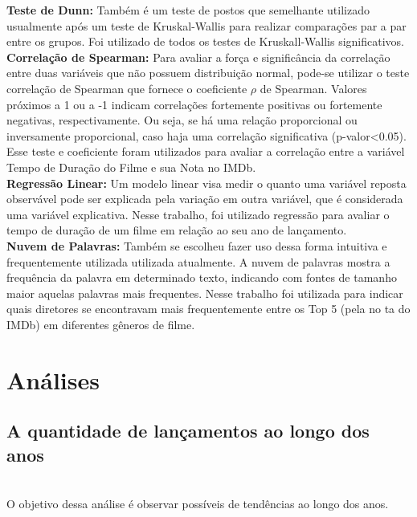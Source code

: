 \documentclass[a4paper, 12pt]{article} %
\begin{document}
\textbf{Teste de Dunn:} Também é um teste de postos que semelhante utilizado usualmente após um teste de Kruskal-Wallis para realizar comparações par a par entre os grupos. Foi utilizado  de todos os testes de Kruskall-Wallis significativos.\\

\textbf{Correlação de Spearman:} Para avaliar a força e significância da correlação entre duas variáveis que não possuem distribuição normal, pode-se utilizar o teste correlação de Spearman que fornece o coeficiente $\rho$ de Spearman. Valores próximos a 1 ou a -1 indicam correlações fortemente positivas ou fortemente negativas, respectivamente. Ou seja, se há uma relação proporcional ou inversamente proporcional, caso haja uma correlação significativa (p-valor<0.05). Esse teste e coeficiente foram utilizados para avaliar a correlação entre a variável Tempo de Duração do Filme e sua Nota no IMDb. \\

\textbf{Regressão Linear:} Um modelo linear visa medir o quanto uma variável reposta observável pode ser explicada pela variação em outra variável, que é considerada uma variável explicativa. Nesse trabalho, foi utilizado regressão para avaliar o tempo de duração de um filme em relação ao seu ano de lançamento.\\

\textbf{Nuvem de Palavras:} Também se escolheu fazer uso dessa  forma intuitiva e frequentemente utilizada utilizada atualmente. A nuvem de palavras mostra a frequência da palavra em determinado texto, indicando com fontes de tamanho maior aquelas palavras mais frequentes. Nesse trabalho foi utilizada para indicar quais diretores se encontravam mais frequentemente entre os Top 5 (pela no ta do IMDb) em diferentes gêneros de filme.  \\



\section{Análises}

\subsection {A quantidade de lançamentos ao longo dos anos}\\

O objetivo dessa análise é observar possíveis de tendências ao longo dos anos. 
\end{document}
